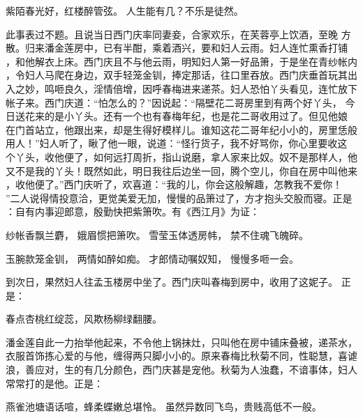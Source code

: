 紫陌春光好，红楼醉管弦。
人生能有几？不乐是徒然。

此事表过不题。且说当日西门庆率同妻妾，合家欢乐，在芙蓉亭上饮酒，至晚
方散。归来潘金莲房中，已有半酣，乘着酒兴，要和妇人云雨。妇人连忙熏香打铺
，和他解衣上床。西门庆且不与他云雨，明知妇人第一好品箫，于是坐在青纱帐内
，令妇人马爬在身边，双手轻笼金钏，捧定那话，往口里吞放。西门庆垂首玩其出
入之妙，鸣咂良久，淫情倍增，因呼春梅进来递茶。妇人恐怕丫头看见，连忙放下
帐子来。西门庆道：“怕怎么的？”因说起：“隔壁花二哥房里到有两个好丫头，
今日送花来的是小丫头。还有一个也有春梅年纪，也是花二哥收用过了。但见他娘
在门首站立，他跟出来，却是生得好模样儿。谁知这花二哥年纪小小的，房里恁般
用人！”妇人听了，瞅了他一眼，说道：“怪行货子，我不好骂你，你心里要收这
个丫头，收他便了，如何远打周折，指山说磨，拿人家来比奴。奴不是那样人，他
又不是我的丫头！既然如此，明日我往后边坐一回，腾个空儿，你自在房中叫他来
，收他便了。”西门庆听了，欢喜道：“我的儿，你会这般解趣，怎教我不爱你！
”二人说得情投意洽，更觉美爱无加，慢慢的品箫过了，方才抱头交股而寝。正是
：自有内事迎郎意，殷勤快把紫箫吹。有《西江月》为证：

纱帐香飘兰麝，
娥眉惯把箫吹。
雪莹玉体透房帏，
禁不住魂飞魄碎。

玉腕款笼金钏，
两情如醉如痴。
才郎情动嘱奴知，
慢慢多咂一会。

到次日，果然妇人往孟玉楼房中坐了。西门庆叫春梅到房中，收用了这妮子。
正是：

春点杏桃红绽蕊，风欺杨柳绿翻腰。

潘金莲自此一力抬举他起来，不令他上锅抹灶，只叫他在房中铺床叠被，递茶水，
衣服首饰拣心爱的与他，缠得两只脚小小的。原来春梅比秋菊不同，性聪慧，喜谑
浪，善应对，生的有几分颜色，西门庆甚是宠他。秋菊为人浊蠢，不谙事体，妇人
常常打的是他。正是：

燕雀池塘语话喧，蜂柔蝶嫩总堪怜。
虽然异数同飞鸟，贵贱高低不一般。